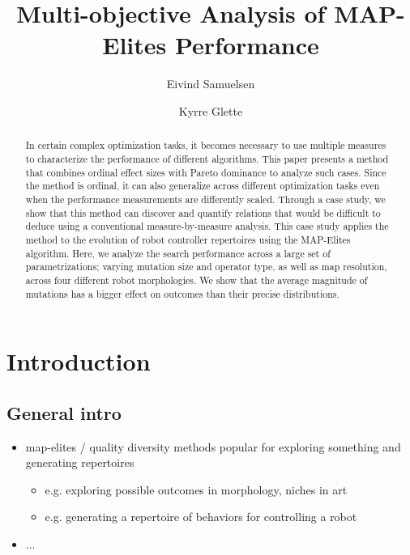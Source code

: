 \documentclass[sigconf, anonymous=false]{acmart}
\begin{document}

\title{Multi-objective Analysis of MAP-Elites Performance}
\author{Eivind Samuelsen}
\author{Kyrre Glette}

\begin{abstract}
In certain complex optimization tasks, it becomes necessary to use multiple measures to characterize the performance of different algorithms. 
This paper presents a method that combines ordinal effect sizes with Pareto dominance to analyze such cases.  Since the method is ordinal, it can also generalize across different optimization tasks even when the performance measurements are differently scaled.  Through a case study, we show that this method can discover and quantify relations that would be difficult to deduce using a conventional measure-by-measure analysis. 
This case study applies the method to the evolution of robot controller repertoires using the MAP-Elites algorithm.
Here, we analyze the search performance across a large set of parametrizations; varying mutation size and operator type, as well as map resolution, across four different robot morphologies. 
We show that the average magnitude of mutations has a bigger effect on outcomes than their precise distributions.
\end{abstract}

\maketitle


\section{Introduction}


\subsection{General intro}
\begin{itemize}
\item map-elites / quality diversity methods popular for exploring something and generating repertoires \cite{Duarte2017}
\begin{itemize}
\item e.g. exploring possible outcomes in morphology, niches in art
\item e.g. generating a repertoire of behaviors for controlling a robot
\end{itemize}
\item ...
\end{itemize}
\end{document}
